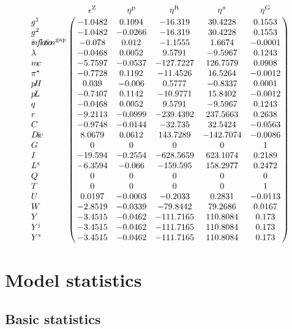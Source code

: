 $$\bordermatrix{
~ & \epsilon^{\mathrm{Z}} & \eta^{\mathrm{p}} & \eta^{\mathrm{R}} & \eta^{\pi} & \eta^{\mathrm{G}} \cr
g^{\mathrm{1}} & -1.0482 & 0.1094 & -16.319 & 30.4228 & 0.1553 \cr
g^{\mathrm{2}} & -1.0482 & -0.0266 & -16.319 & 30.4228 & 0.1553 \cr
{i\!n\!f\!l\!a\!t\!i\!o\!n}^{\mathrm{gap}} & -0.078 & 0.012 & -1.1555 & 1.6674 & -0.0001 \cr
\lambda & -0.0468 & 0.0052 & 9.5791 & -9.5967 & 0.1243 \cr
{m\!c} & -5.7597 & -0.0537 & -127.7227 & 126.7579 & 0.0908 \cr
\pi^{\star} & -0.7728 & 0.1192 & -11.4526 & 16.5264 & -0.0012 \cr
{p\!H} & 0.039 & -0.006 & 0.5777 & -0.8337 & 0.0001 \cr
{p\!L} & -0.7407 & 0.1142 & -10.9771 & 15.8402 & -0.0012 \cr
q & -0.0468 & 0.0052 & 9.5791 & -9.5967 & 0.1243 \cr
r & -9.2113 & -0.0999 & -239.4392 & 237.5663 & 0.2638 \cr
C & -0.9748 & -0.0144 & -32.735 & 32.5424 & -0.0563 \cr
{D\!i\!v} & 8.0679 & 0.0612 & 143.7289 & -142.7074 & -0.0086 \cr
G & 0 & 0 & 0 & 0 & 1 \cr
I & -19.594 & -0.2554 & -628.5659 & 623.1074 & 0.2189 \cr
L^{\mathrm{s}} & -6.3594 & -0.066 & -159.595 & 158.2977 & 0.2472 \cr
Q & 0 & 0 & 0 & 0 & 0 \cr
T & 0 & 0 & 0 & 0 & 1 \cr
U & 0.0197 & -0.0003 & -0.2033 & 0.2831 & -0.0113 \cr
W & -2.8519 & -0.0339 & -79.8442 & 79.2686 & 0.0167 \cr
Y & -3.4515 & -0.0462 & -111.7165 & 110.8084 & 0.173 \cr
Y^{\mathrm{j}} & -3.4515 & -0.0462 & -111.7165 & 110.8084 & 0.173 \cr
Y^{\mathrm{s}} & -3.4515 & -0.0462 & -111.7165 & 110.8084 & 0.173 \cr
}$$


\section{Model statistics}

\subsection{Basic statistics}

